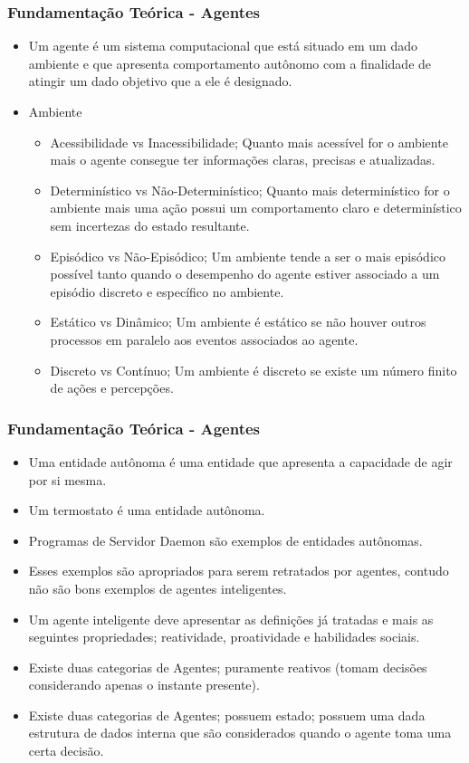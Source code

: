 \documentclass{beamer}
\begin{document}
\begin{frame}
\frametitle{Fundamentação Teórica - Agentes}
	\begin{itemize}
		\item Um agente é um sistema computacional que está situado em um dado ambiente e que apresenta comportamento autônomo com a finalidade de atingir um dado objetivo que a ele é designado. 
		\item Ambiente
		\begin{itemize}
			\item Acessibilidade vs Inacessibilidade; Quanto mais acessível for o ambiente mais o agente consegue ter informações claras, precisas e atualizadas. 
			\item Determinístico vs Não-Determinístico; Quanto mais determinístico for o ambiente mais uma ação possui um comportamento claro e determinístico sem incertezas do estado resultante. 
			\item Episódico vs Não-Episódico; Um ambiente tende a ser o mais episódico possível tanto
			quando o desempenho do agente estiver associado a um episódio discreto e específico no
			ambiente.			
			\item Estático vs Dinâmico; Um ambiente é estático se não houver outros processos em paralelo aos eventos associados ao agente.
			\item Discreto vs Contínuo; Um ambiente é discreto se existe um número finito de ações e percepções. 
		\end{itemize}
	\end{itemize}
\end{frame}

\begin{frame}
\frametitle{Fundamentação Teórica - Agentes}
	\begin{itemize}
		\item Uma entidade autônoma é uma entidade que apresenta a capacidade de agir por si mesma. 
		\item Um termostato é uma entidade autônoma. 
		\item Programas de Servidor Daemon são exemplos de entidades autônomas. 
		\item Esses exemplos são apropriados para serem retratados por agentes, contudo não são bons exemplos de agentes inteligentes. 
		\item Um agente inteligente deve apresentar as definições já tratadas e mais as seguintes propriedades; reatividade, proatividade e habilidades sociais.  
		\item Existe duas categorias de Agentes; puramente reativos (tomam decisões considerando apenas o instante presente).
		\item Existe duas categorias de Agentes; possuem estado; possuem uma dada estrutura de dados interna que são considerados quando o agente toma uma certa decisão.
	\end{itemize}
\end{frame}
\end{document}
